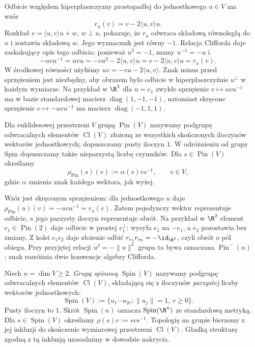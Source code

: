 Odbicie względem hiperpłaszczyzny prostopadłej
do jednostkowego $u\in V$ ma wzór
\begin{equation}\label{eq:spin-odbicie}
 r_u(v)=v-2\langle u,v\rangle u.
\end{equation}
Rozkład $v=\langle u,v\rangle u+w$, $w\perp u$,
pokazuje, że $r_u$ odwraca składową równoległą do $u$
i zostawia składową $w$. Jego wyznacznik jest równy $-1$.
Relacja Clifforda daje zaskakujący opis tego odbicia:
ponieważ $u^2=-1$, mamy $u^{-1}=-u$ i
\[
 -uvu^{-1}=uvu
 =-vu^2-2\langle u,v\rangle u
 =v-2\langle u,v\rangle u
 =r_u(v).
\]
W środkowej równości użyliśmy
$uv=-vu-2\langle u,v\rangle$. Znak minus przed
sprzężeniem jest niezbędny, aby obrazem było odbicie
w hiperpłaszczyźnie $u^\perp$ w każdym wymiarze.
Na przykład w $\R^3$ dla $u=e_1$ zwykłe sprzężenie
$v\mapsto uvu^{-1}$ ma w bazie standardowej macierz
$\operatorname{diag}(1,-1,-1)$, natomiast skręcone sprzężenie
$v\mapsto-uvu^{-1}$ ma macierz $\operatorname{diag}(-1,1,1)$.

\begin{definicja}
\label{def:pin-grupa}
Dla euklidesowej przestrzeni $V$ grupą $\operatorname{Pin}(V)$
nazywamy podgrupę odwracalnych elementów $\operatorname{Cl}(V)$
złożoną ze wszystkich skończonych iloczynów wektorów
jednostkowych; dopuszczamy pusty iloczyn $1$.
W odróżnieniu od grupy Spin dopuszczamy także nieparzystą
liczbę czynników. Dla $s\in\operatorname{Pin}(V)$ określamy
\[
 \rho_{\mathrm{Pin}}(s)(v):=\alpha(s)v s^{-1},
 \qquad v\in V,
\]
gdzie $\alpha$ zmienia znak każdego wektora, jak wyżej.
\end{definicja}

Wzór jest skręconym sprzężeniem: dla jednostkowego $u$
daje $\rho_{\mathrm{Pin}}(u)(v)=-uvu^{-1}=r_u(v)$.
Zatem pojedynczy wektor reprezentuje odbicie, a jego parzysty
iloczyn reprezentuje obrót. Na przykład w $\R^2$ element
$e_1\in\operatorname{Pin}(2)$ daje odbicie w prostej
$e_1^\perp$: wysyła $e_1$ na $-e_1$, a $e_2$ pozostawia
bez zmiany. Z kolei $e_1e_2$ daje złożenie odbić
$r_{e_1}r_{e_2}=-\id_{\R^2}$, czyli obrót o pół obiegu.
Przy przyjętej relacji $u^2=-\|u\|^2$ grupa ta bywa
oznaczana $\operatorname{Pin}^{-}(n)$; znak rozróżnia dwie
konwencje algebry Clifforda.

\begin{definicja}
\label{def:spin-grupa}
Niech $n=\dim V\geq2$. \emph{Grupą spinową}
$\operatorname{Spin}(V)$ nazywamy podgrupę
odwracalnych elementów $\operatorname{Cl}(V)$,
składającą się z iloczynów \emph{parzystej}
liczby wektorów jednostkowych:
\[
 \operatorname{Spin}(V)
 :=\{u_1\cdots u_{2r}:\|u_j\|=1,\ r\geq0\}.
\]
Pusty iloczyn to $1$. Skrót
$\operatorname{Spin}(n)$ oznacza
$\operatorname{Spin}(\R^n)$ ze standardową metryką.
Dla $s\in\operatorname{Spin}(V)$ określamy
$\rho(s)v:=svs^{-1}$.
Topologię na grupie bierzemy z jej inkluzji do skończenie
wymiarowej przestrzeni $\operatorname{Cl}(V)$. Gładką strukturę
zgodną z tą inkluzją uzasadnimy w dowodzie nakrycia.
\end{definicja}


